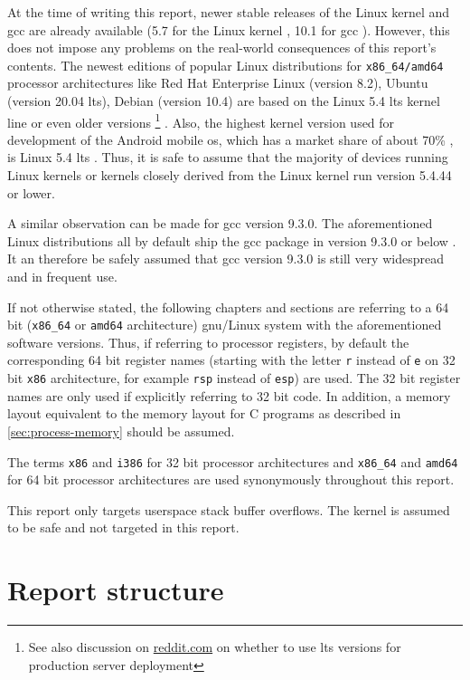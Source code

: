 At the time of writing this report, newer stable releases of the Linux kernel and \gls{gcc} are already available (5.7 for the Linux kernel \cite{LKO2020a}, 10.1 for \gls{gcc} \cite{FSF2020}).
However, this does not impose any problems on the real-world consequences of this report's contents.
The newest editions of popular Linux distributions for \texttt{x86\_64/amd64} processor architectures like Red Hat Enterprise Linux (version 8.2), Ubuntu (version 20.04 \gls{lts}), Debian (version 10.4) are based on the Linux 5.4 \gls{lts} kernel line or even older versions%
	\footnote{See also discussion on \href{https://www.reddit.com/r/webhosting/comments/beg0z0/should_i_use_an_lts_version_of_ubuntu_for_my_web/}{reddit.com} on whether to use \gls{lts} versions for production server deployment}
\cite{RedHat2020,Canonical2020,SPI2020,SPI2020a}.
Also, the highest kernel version used for development of the Android mobile \gls{os}, which has a market share of about 70\% \cite{Statcounter2020}, is Linux 5.4 \gls{lts} \cite{GoogleLLC2020}.
Thus, it is safe to assume that the majority of devices running Linux kernels or kernels closely derived from the Linux kernel run version 5.4.44 or lower.

A similar observation can be made for \gls{gcc} version 9.3.0.
The aforementioned Linux distributions all by default ship the \gls{gcc} package in version 9.3.0 or below \cite{RedHat2020a,Canonical2020a,SPI2020b}.
It an therefore be safely assumed that \gls{gcc} version 9.3.0 is still very widespread and in frequent use.

If not otherwise stated, the following chapters and sections are referring to a 64 bit (\texttt{x86\_64} or \texttt{amd64} architecture) \acrshort{gnu}/Linux system with the aforementioned software versions.
Thus, if referring to processor registers, by default the corresponding 64 bit register names (starting with the letter \texttt{r} instead of \texttt{e} on 32 bit \texttt{x86} architecture, for example \texttt{rsp} instead of \texttt{esp}) are used.
The 32 bit register names are only used if explicitly referring to 32 bit code.
In addition, a memory layout equivalent to the memory layout for C programs as described in \cref{sec:process-memory} should be assumed.

The terms \texttt{x86} and \texttt{i386} for 32 bit processor architectures and \texttt{x86\_64} and \texttt{amd64} for 64 bit processor architectures are used synonymously throughout this report.

This report only targets userspace stack buffer overflows.
The kernel is assumed to be safe and not targeted in this report.

\section{Report structure}
\label{sec:report-structure}

